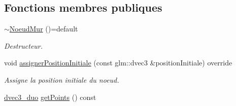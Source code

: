 \subsection*{Fonctions membres publiques}
\begin{DoxyCompactItemize}
\item 
\hypertarget{class_noeud_mur_a8333a4752804a1b5d7fee96e66624b48}{\hyperlink{class_noeud_mur_a8333a4752804a1b5d7fee96e66624b48}{$\sim$\-Noeud\-Mur} ()=default}\label{class_noeud_mur_a8333a4752804a1b5d7fee96e66624b48}

\begin{DoxyCompactList}\small\item\em Destructeur. \end{DoxyCompactList}\item 
void \hyperlink{class_noeud_mur_ac25cc3603e2512dee3903b3c6d0fea3a}{assigner\-Position\-Initiale} (const glm\-::dvec3 \&position\-Initiale) override
\begin{DoxyCompactList}\small\item\em Assigne la position initiale du noeud. \end{DoxyCompactList}\item 
\hyperlink{struct_noeud_mur_1_1dvec3__duo}{dvec3\-\_\-duo} \hyperlink{class_noeud_mur_a5ce727f4e6a6aa6794e700e8e36d9aa6}{get\-Points} () const 
\end{DoxyCompactItemize}
{\bf }\par
